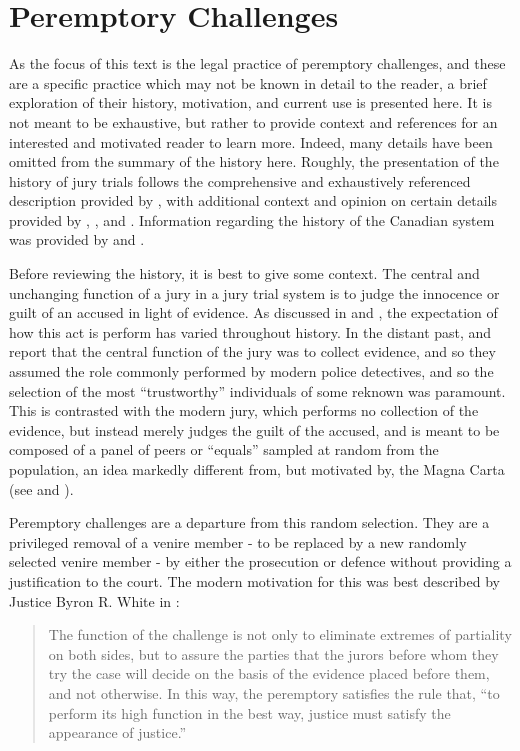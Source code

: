 \chapter{Peremptory Challenges} \label{c:background}

As the focus of this text is the legal practice of peremptory challenges, and these are a specific practice which may not be known
in detail to the reader, a brief exploration of their history, motivation, and current use is presented here. It is not meant to
be exhaustive, but rather to provide context and references for an interested and motivated reader to learn more. Indeed, many
details have been omitted from the summary of the history here. Roughly, the presentation of the history of jury trials follows
the comprehensive and exhaustively referenced description provided by \cite{hoffman1997}, with additional context and opinion on
certain details provided by \cite{vonmosch1921}, \cite{forsythhistory}, and \cite{brown2000}. Information regarding the history of
the Canadian system was provided by \cite{brown2000} and \cite{petersen1993}.

Before reviewing the history, it is best to give some context. The central and unchanging function of a jury in a jury trial
system is to judge the innocence or guilt of an accused in light of evidence. As discussed in \cite{vonmosch1921} and
\cite{forsythhistory}, the expectation of how this act is perform has varied throughout history. In the distant past,
\cite{vonmosch1921} and \cite{hoffman1997} report that the central function of the jury was to collect evidence, and so they
assumed the role commonly performed by modern police detectives, and so the selection of the most ``trustworthy'' individuals of
some reknown was paramount. This is contrasted with the modern jury, which performs no collection of the evidence, but instead
merely judges the guilt of the accused, and is meant to be composed of a panel of peers or ``equals'' sampled at random from the
population, an idea markedly different from, but motivated by, the Magna Carta (see \cite{davismagnacar} and \cite{hoffman1997}).

Peremptory challenges are a departure from this random selection. They are a privileged removal of a venire member - to be
replaced by a new randomly selected venire member -  by either the prosecution or defence without providing a justification to the
court. The modern motivation for this was best described by Justice Byron R. White in \cite{swainvalabama}:

\begin{quote}
\centering
The function of the challenge is not only to eliminate extremes of partiality on both sides, but to assure the parties that the
jurors before whom they try the case will decide on the basis of the evidence placed before them, and not otherwise. In this way,
the peremptory satisfies the rule that, ``to perform its high function in the best way, justice must satisfy the appearance of
justice.''
\end{quote}

